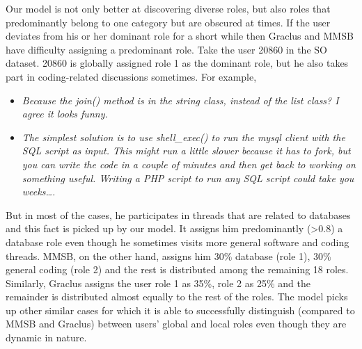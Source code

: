 \documentclass{sig-alternate}
\newcommand{\abhi}[1]{\textcolor{blue}{\\ abhi-comment: #1}}
\newcommand{\comment}[1]{\textcolor{red}{[#1]}}
\begin{document}
Our model is not only better at discovering diverse roles, but also roles 
that predominantly belong to one category but are obscured at times. 
If the user deviates from his or her dominant role
for a short while then Graclus and MMSB have difficulty assigning
a predominant role. 
Take the user 20860 in the SO dataset. 20860 is globally assigned 
role 1 as the dominant role, but he also takes part in coding-related 
discussions sometimes. For example, 
\small
\begin{itemize}
  \item \textit{Because the join() method is in 
the string class, instead of the list class?
I agree it looks funny.}  
\item \textit{The simplest solution is to use
shell\_exec() to run the mysql client with the SQL script as input. 
This might run a little slower because it has to fork, but you can write 
the code in a couple of minutes and then get back to working on something useful. 
Writing a PHP script to run any SQL script could take you weeks\ldots.}
\end{itemize}
\normalsize
But in most of the cases, he participates in threads that are 
related to databases and this fact is picked up by our
model. It assigns him predominantly (>0.8) a database role 
even though he sometimes visits 
more general software and coding threads. 
MMSB, on the other hand, assigns him 30\%
database (role 1), 30\% general coding (role 2) and the 
rest is distributed among the
remaining 18 roles. Similarly, Graclus assigns the user role 1 as 35\%, role 2
as 25\% and the remainder is distributed almost equally 
to the rest of the roles. 
The model picks up other similar cases for which it is able
to successfully distinguish (compared to MMSB and Graclus) 
between users' global and local
roles even though they are dynamic in nature.


\vspace*{-0.5\baselineskip}
\end{document}
